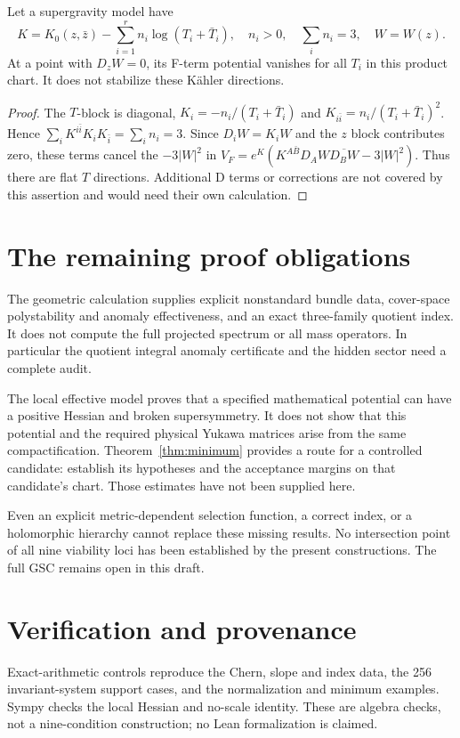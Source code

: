 \begin{proposition}\label{prop:noscale}
Let a supergravity model have
\[
 K=K_0(z,\bar z)-\sum_{i=1}^r n_i\log(T_i+\bar T_i),
 \quad n_i>0,\quad\sum_i n_i=3,\quad W=W(z).
\]
At a point with $D_zW=0$, its F-term potential vanishes for all $T_i$
in this product chart. It does not stabilize these K\"ahler directions.
\end{proposition}
\begin{proof}
The $T$-block is diagonal,
$K_i=-n_i/(T_i+\bar T_i)$ and
$K_{i\bar i}=n_i/(T_i+\bar T_i)^2$. Hence
$\sum_iK^{i\bar i}K_iK_{\bar i}=\sum_i n_i=3$.
Since $D_iW=K_iW$ and the $z$ block contributes zero, these terms cancel
the $-3|W|^2$ in $V_F=e^K(K^{A\bar B}D_AW\overline{D_BW}-3|W|^2)$.
Thus there are flat $T$ directions. Additional D terms or corrections are
not covered by this assertion and would need their own calculation.
\end{proof}

\section{The remaining proof obligations}
The geometric calculation supplies explicit nonstandard bundle data,
cover-space polystability and anomaly effectiveness, and an exact
three-family quotient index. It does not compute the full projected
spectrum or all mass operators. In particular the quotient integral
anomaly certificate and the hidden sector need a complete audit.

The local effective model proves that a specified mathematical potential
can have a positive Hessian and broken supersymmetry. It does not show that
this potential and the required physical Yukawa matrices arise from the
same compactification. Theorem~\ref{thm:minimum} provides a route for a
controlled candidate: establish its hypotheses and the acceptance margins
on that candidate's chart. Those estimates have not been supplied here.

Even an explicit metric-dependent selection function, a correct index,
or a holomorphic hierarchy cannot replace these missing results. No
intersection point of all nine viability loci has been established by
the present constructions. The full GSC remains open in this draft.

\section*{Verification and provenance}
Exact-arithmetic controls reproduce the Chern, slope and index data, the
256 invariant-system support cases, and the normalization and minimum
examples. Sympy checks the local Hessian and no-scale identity. These are
algebra checks, not a nine-condition construction; no Lean formalization
is claimed.


